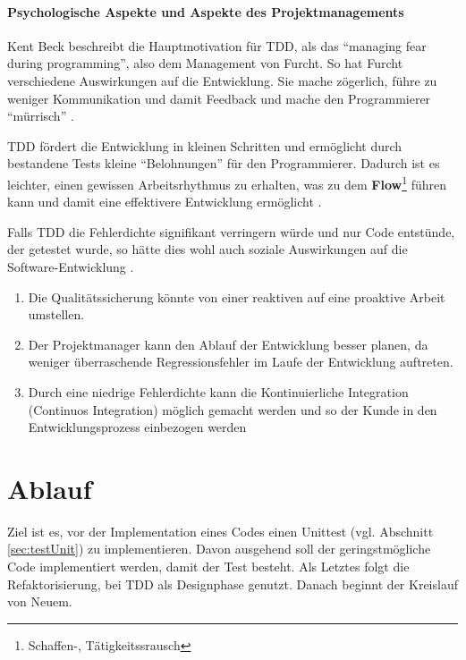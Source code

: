   \paragraph{Psychologische Aspekte und Aspekte des Projektmanagements}

  Kent Beck beschreibt die Hauptmotivation für TDD, als das "`managing fear during programming"', also dem Management von Furcht. So hat Furcht verschiedene Auswirkungen auf die Entwicklung. Sie mache zögerlich, führe zu weniger Kommunikation und damit Feedback und mache den Programmierer "`mürrisch"' \citep[S. xi]{beck_test_2002}.


  TDD fördert die Entwicklung in kleinen Schritten und ermöglicht durch bestandene Tests kleine "`Belohnungen"' für den Programmierer. Dadurch ist es leichter, einen gewissen Arbeitsrhythmus zu erhalten, was zu dem \textbf{Flow}\footnote{Schaffen-, Tätigkeitssrausch} führen kann und damit eine effektivere Entwicklung ermöglicht \citep{roger_brown_test_2008}.

  Falls TDD die Fehlerdichte signifikant verringern würde und nur Code entstünde, der getestet wurde, so hätte dies wohl auch soziale Auswirkungen auf die Software-Entwicklung \citep[S. x]{beck_test_2002}.
  \begin{enumerate}
   \item Die Qualitätssicherung könnte von einer reaktiven auf eine proaktive Arbeit umstellen.
   \item Der Projektmanager kann den Ablauf der Entwicklung besser planen, da weniger überraschende Regressionsfehler im Laufe der Entwicklung auftreten.
   \item Durch eine niedrige Fehlerdichte kann die Kontinuierliche Integration (Continuos Integration) möglich gemacht werden und so der Kunde in den Entwicklungsprozess einbezogen werden
  \end{enumerate}



\section{Ablauf}
  Ziel ist es, vor der Implementation eines Codes einen Unittest (vgl. Abschnitt \ref{sec:testUnit}) zu implementieren. Davon ausgehend soll der geringstmögliche Code implementiert werden, damit der Test besteht. Als Letztes folgt die Refaktorisierung, bei TDD als Designphase genutzt. Danach beginnt der Kreislauf von Neuem.

